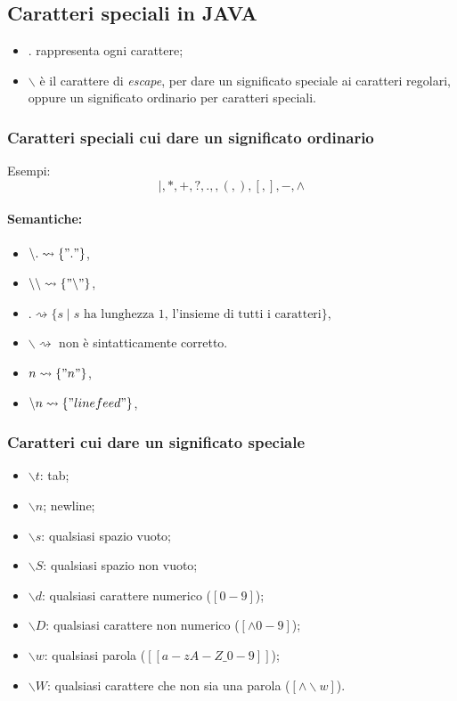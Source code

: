 \subsection{Caratteri speciali in JAVA}
\begin{itemize}
  \item $.$ rappresenta ogni carattere;
  \item $\backslash$ è il carattere di \emph{escape}, per dare un significato speciale
    ai caratteri regolari, oppure un significato ordinario per caratteri
    speciali.
\end{itemize}

\subsubsection{Caratteri speciali cui dare un significato ordinario}
Esempi:
\[
  |,*,+,?,.,,(,),[,],-,\wedge
\]
\paragraph{Semantiche:}
\begin{itemize}
  \item $\backslash.\rightsquigarrow\{"."\}$,
  \item $\backslash\backslash\rightsquigarrow\{"\backslash"\}$,
  \item $.\rightsquigarrow\{s\mid s\text{ ha lunghezza }1\text{, l'insieme di
    tutti i caratteri} \}$,
  \item $\backslash\rightsquigarrow$ non è sintatticamente corretto.
  \item $n\rightsquigarrow\{"n"\}$,
  \item $\backslash n\rightsquigarrow\{"linefeed"\}$,
\end{itemize}

\subsubsection{Caratteri cui dare un significato speciale}
\begin{itemize}
  \item $\backslash t$: tab;
  \item $\backslash n$; newline;
  \item $\backslash s$: qualsiasi spazio vuoto;
  \item $\backslash S$: qualsiasi spazio non vuoto;
  \item $\backslash d$: qualsiasi carattere numerico ($[0-9]$);
  \item $\backslash D$: qualsiasi carattere non numerico
    ($[\wedge0-9]$);
  \item $\backslash w$: qualsiasi parola ($[[a-zA-Z\_0-9]]$);
  \item $\backslash W$: qualsiasi carattere che non sia una parola
    ($[\wedge\backslash w]$).
\end{itemize}

